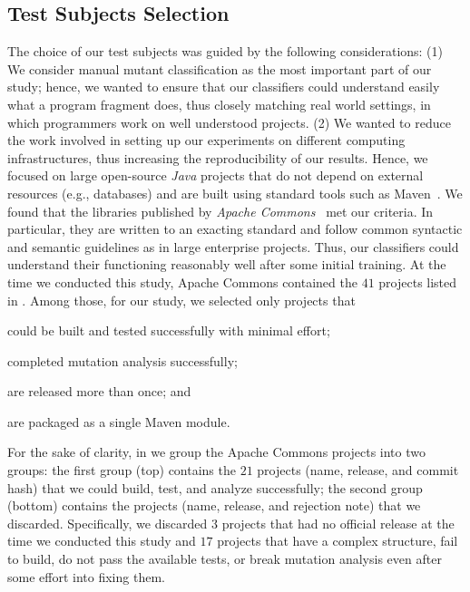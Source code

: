 \documentclass[sigconf]{acmart}
\begin{document}
\subsection{Test Subjects Selection}
\label{sec:selection}
The choice of our test subjects was guided by the following considerations:
(1) We consider manual mutant classification as the most important part of our study;
hence, we wanted to ensure that our classifiers could understand easily what a program
fragment does, thus closely matching real world settings, in which programmers
work on well understood projects.
(2) We wanted to reduce the work involved in setting up our experiments
on different computing infrastructures, thus %
increasing the reproducibility of our results. 
Hence, we focused on large open-source \emph{Java} projects that do
not depend on
external resources (e.g., databases) and are built using standard tools such as Maven~\cite{maven}.
We found that the libraries published by \emph{Apache Commons}~\cite{commons} met our criteria.
In particular, they are written to an exacting standard and follow common syntactic
and semantic guidelines as in large enterprise projects. Thus, our classifiers
could understand their functioning %
reasonably well after some initial training.
At the time we conducted this study,
Apache Commons contained the $41$ projects listed in .
Among those, for our study, we selected only projects that
\begin{enumerate*}[label=(\arabic*)]
  \item could be built and tested successfully with minimal effort;
  \item completed mutation analysis successfully;
  \item are released more than once; and
  \item are packaged as a single Maven module.
\end{enumerate*}

For the sake of clarity, in  we group the
Apache Commons projects into two groups:
the first group (top) contains the $21$ projects (name, release, and commit hash)
that we could build, test, and analyze successfully;
the second group (bottom) contains the projects (name, release, and rejection note) that we discarded.
Specifically, we discarded $3$ %
projects that had no official release at the time we conducted this study and 
$17$ projects that have a complex structure, fail to build, do not pass the available tests,
or break mutation analysis even after some effort into fixing them.%
\end{document}
